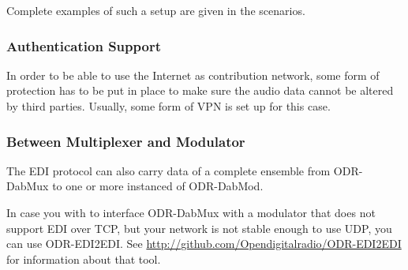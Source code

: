 Complete examples of such a setup are given in the scenarios.

\subsubsection{Authentication Support}
In order to be able to use the Internet as contribution network, some form of
protection has to be put in place to make sure the audio data cannot be altered
by third parties. Usually, some form of VPN is set up for this case.


\subsubsection{Between Multiplexer and Modulator}

The EDI protocol can also carry data of a complete ensemble from ODR-DabMux to
one or more instanced of ODR-DabMod.

In case you with to interface ODR-DabMux with a modulator that does not support
EDI over TCP, but your network is not stable enough to use UDP, you can use
ODR-EDI2EDI. See \url{http://github.com/Opendigitalradio/ODR-EDI2EDI} for
information about that tool.

